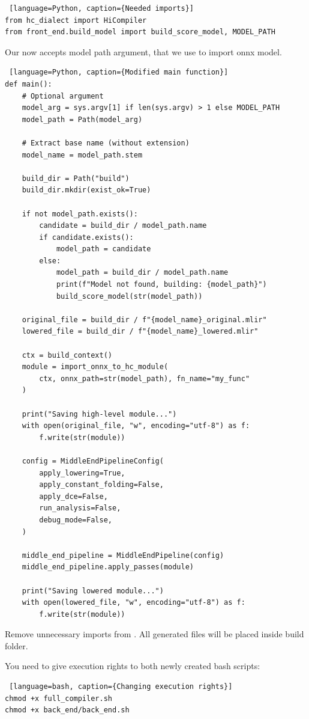 \documentclass[../main.tex]{subfiles}
\begin{document}
\begin{lstlisting} [language=Python, caption={Needed imports}]
from hc_dialect import HiCompiler
from front_end.build_model import build_score_model, MODEL_PATH
\end{lstlisting}

Our  now accepts model path argument, that we use to import
onnx model.
\begin{lstlisting} [language=Python, caption={Modified main function}]
def main():
    # Optional argument
    model_arg = sys.argv[1] if len(sys.argv) > 1 else MODEL_PATH
    model_path = Path(model_arg)

    # Extract base name (without extension)
    model_name = model_path.stem

    build_dir = Path("build")
    build_dir.mkdir(exist_ok=True)

    if not model_path.exists():
        candidate = build_dir / model_path.name
        if candidate.exists():
            model_path = candidate
        else:
            model_path = build_dir / model_path.name
            print(f"Model not found, building: {model_path}")
            build_score_model(str(model_path))

    original_file = build_dir / f"{model_name}_original.mlir"
    lowered_file = build_dir / f"{model_name}_lowered.mlir"

    ctx = build_context()
    module = import_onnx_to_hc_module(
        ctx, onnx_path=str(model_path), fn_name="my_func"
    )

    print("Saving high-level module...")
    with open(original_file, "w", encoding="utf-8") as f:
        f.write(str(module))

    config = MiddleEndPipelineConfig(
        apply_lowering=True,
        apply_constant_folding=False,
        apply_dce=False,
        run_analysis=False,
        debug_mode=False,
    )

    middle_end_pipeline = MiddleEndPipeline(config)
    middle_end_pipeline.apply_passes(module)

    print("Saving lowered module...")
    with open(lowered_file, "w", encoding="utf-8") as f:
        f.write(str(module))
\end{lstlisting}
Remove unnecessary imports from .
All generated files will be placed inside build folder.

You need to give execution rights to both newly created bash scripts:
\begin{lstlisting} [language=bash, caption={Changing execution rights}]
chmod +x full_compiler.sh
chmod +x back_end/back_end.sh
\end{lstlisting}
\end{document}
